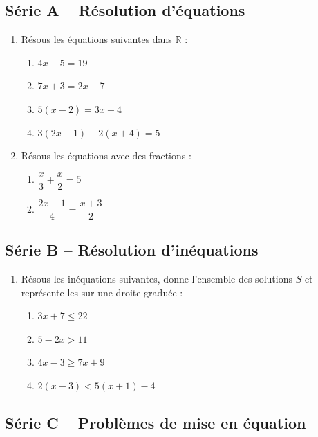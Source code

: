 \documentclass[../main.tex]{subfiles}
\begin{document}
\subsection{Série A -- Résolution d'équations}

\begin{enumerate}[label=\textbf{\arabic*.}]

\item Résous les équations suivantes dans $\mathbb{R}$ :
\begin{enumerate}[label=\alph*)]
  \item $4x - 5 = 19$ \qquad
  \item $7x + 3 = 2x - 7$ \qquad
  \item $5(x - 2) = 3x + 4$ \qquad
  \item $3(2x - 1) - 2(x + 4) = 5$
\end{enumerate}

\item Résous les équations avec des fractions :
\begin{enumerate}[label=\alph*)]
  \item $\dfrac{x}{3} + \dfrac{x}{2} = 5$ \qquad
  \item $\dfrac{2x - 1}{4} = \dfrac{x + 3}{2}$
\end{enumerate}

\end{enumerate}

\subsection{Série B -- Résolution d'inéquations}

\begin{enumerate}[label=\textbf{\arabic*.},start=3]

\item Résous les inéquations suivantes, donne l'ensemble des solutions $S$ et représente-les sur une droite graduée :
\begin{enumerate}[label=\alph*)]
  \item $3x + 7 \le 22$ \qquad
  \item $5 - 2x > 11$ \qquad
  \item $4x - 3 \ge 7x + 9$ \qquad
  \item $2(x - 3) < 5(x + 1) - 4$
\end{enumerate}

\end{enumerate}

\subsection{Série C -- Problèmes de mise en équation}
\end{document}

